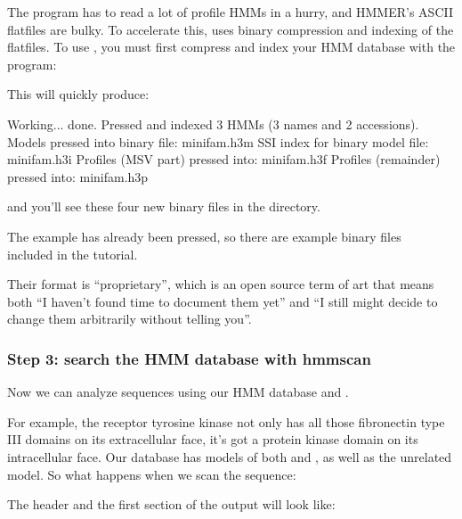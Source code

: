The  program has to read a lot of profile HMMs in a
hurry, and HMMER's ASCII flatfiles are bulky. To accelerate this,
 uses binary compression and indexing of the flatfiles.
To use , you must first compress and index your HMM
database with the  program:


This will quickly produce:

\begin{sreoutput}
Working...    done.
Pressed and indexed 3 HMMs (3 names and 2 accessions).
Models pressed into binary file:   minifam.h3m
SSI index for binary model file:   minifam.h3i
Profiles (MSV part) pressed into:  minifam.h3f
Profiles (remainder) pressed into: minifam.h3p
\end{sreoutput}

and you'll see these four new binary files in the directory. 

The  example has already been pressed, so there
are example binary files\\
included in the tutorial.

Their format is ``proprietary'', which is an open source term of art
that means both ``I haven't found time to document them yet'' and ``I
still might decide to change them arbitrarily without telling you''.


\subsubsection{Step 3: search the HMM database with hmmscan}

Now we can analyze sequences using our HMM database and
. 

For example, the receptor tyrosine kinase  not only
has all those fibronectin type III domains on its extracellular face,
it's got a protein kinase domain on its intracellular face. Our
 database has models of both  and
, as well as the unrelated  model. So
what happens when we scan the  sequence:


The header and the first section of the output will look like:

